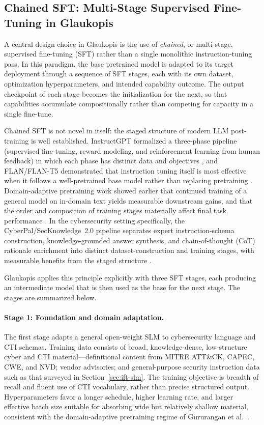 \documentclass[unnumsec,webpdf,contemporary,large]{oup-authoring-template}
\theoremstyle{thmstyleone}
\theoremstyle{thmstyletwo}
\theoremstyle{thmstylethree}
\begin{document}
\subsection{Chained SFT: Multi-Stage Supervised Fine-Tuning in Glaukopis}
\label{sec:chained-sft}

A central design choice in Glaukopis is the use of \emph{chained}, or multi-stage, supervised fine-tuning (SFT) rather than a single monolithic instruction-tuning pass. In this paradigm, the base pretrained model is adapted to its target deployment through a sequence of SFT stages, each with its own dataset, optimization hyperparameters, and intended capability outcome. The output checkpoint of each stage becomes the initialization for the next, so that capabilities accumulate compositionally rather than competing for capacity in a single fine-tune.

Chained SFT is not novel in itself: the staged structure of modern LLM post-training is well established. InstructGPT formalized a three-phase pipeline (supervised fine-tuning, reward modeling, and reinforcement learning from human feedback) in which each phase has distinct data and objectives \cite{ouyang2022instructgpt}, and FLAN/FLAN-T5 demonstrated that instruction tuning itself is most effective when it follows a well-pretrained base model rather than replacing pretraining \cite{wei2022flan,chung2022flant5}. Domain-adaptive pretraining work showed earlier that continued training of a general model on in-domain text yields measurable downstream gains, and that the order and composition of training stages materially affect final task performance \cite{gururangan2020dontstop}. In the cybersecurity setting specifically, the CyberPal/SecKnowledge~2.0 pipeline separates expert instruction-schema construction, knowledge-grounded answer synthesis, and chain-of-thought (CoT) rationale enrichment into distinct dataset-construction and training stages, with measurable benefits from the staged structure \cite{levi2024cyberpal,levi2025toward}.

Glaukopis applies this principle explicitly with three SFT stages, each producing an intermediate model that is then used as the base for the next stage. The stages are summarized below.

\paragraph{Stage 1: Foundation and domain adaptation.}
The first stage adapts a general open-weight SLM to cybersecurity language and CTI schemas. Training data consists of broad, knowledge-dense, low-structure cyber and CTI material---definitional content from MITRE ATT\&CK, CAPEC, CWE, and NVD; vendor advisories; and general-purpose security instruction data such as that surveyed in Section~\ref{sec:ift-slm}. The training objective is breadth of recall and fluent use of CTI vocabulary, rather than precise structured output. Hyperparameters favor a longer schedule, higher learning rate, and larger effective batch size suitable for absorbing wide but relatively shallow material, consistent with the domain-adaptive pretraining regime of Gururangan et al.\ \cite{gururangan2020dontstop}.
\end{document}
